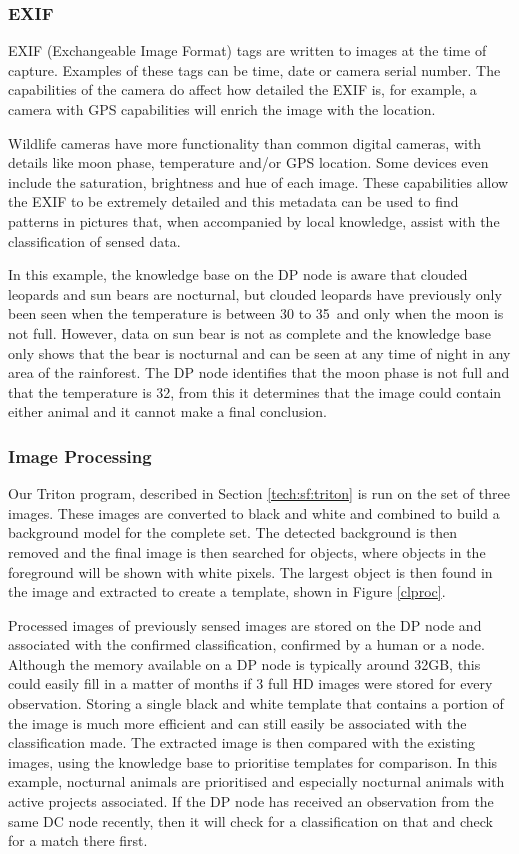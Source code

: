 		\subsubsection{EXIF}
			EXIF (Exchangeable Image Format) tags are written to images at the time of capture. Examples of these tags can be time, date or camera serial number. The capabilities of the camera do affect how detailed the EXIF is, for example, a camera with GPS capabilities will enrich the image with the location. 

			Wildlife cameras have more functionality than common digital cameras, with details like moon phase, temperature and/or GPS location. Some devices even include the saturation, brightness and hue of each image. These capabilities allow the EXIF to be extremely detailed and this metadata can be used to find patterns in pictures that, when accompanied by local knowledge, assist with the classification of sensed data. 

			In this example, the knowledge base on the DP node is aware that clouded leopards and sun bears are nocturnal, but clouded leopards have previously only been seen when the temperature is between 30 to 35\celsius\ and only when the moon is not full. However, data on sun bear is not as complete and the knowledge base only shows that the bear is nocturnal and can be seen at any time of night in any area of the rainforest. The DP node identifies that the moon phase is not full and that the temperature is 32\celsius, from this it determines that the image could contain either animal and it cannot make a final conclusion.

		\subsubsection{Image Processing}
			Our Triton program, described in Section \ref{tech:sf:triton} is run on the set of three images. These images are converted to black and white and combined to build a background model for the complete set. The detected background is then removed and the final image is then searched for objects, where objects in the foreground will be shown with white pixels. The largest object is then found in the image and extracted to create a template, shown in Figure \ref{clproc}.

			Processed images of previously sensed images are stored on the DP node and associated with the confirmed classification, confirmed by a human or a node. Although the memory available on a DP node is typically around 32GB, this could easily fill in a matter of months if 3 full HD images were stored for every observation. Storing a single black and white template that contains a portion of the image is much more efficient and can still easily be associated with the classification made. The extracted image is then compared with the existing images, using the knowledge base to prioritise templates for comparison. In this example, nocturnal animals are prioritised and especially nocturnal animals with active projects associated. If the DP node has received an observation from the same DC node recently, then it will check for a classification on that and check for a match there first.

